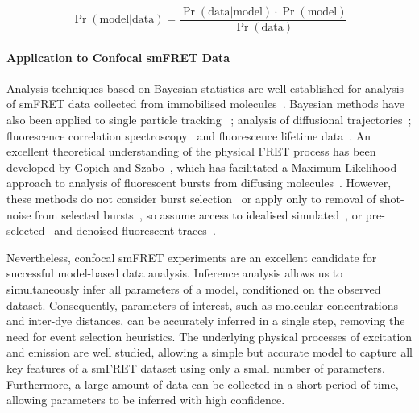 \begin{equation}
\Pr(\text{model}|\text{data}) = \frac{\Pr(\text{data}|\text{model}) \cdot \Pr(\text{model})}{\Pr(\text{data})} 
\label{eq:model_probability}
\end{equation}

\paragraph{Application to Confocal smFRET Data}
Analysis techniques based on Bayesian statistics are well established for analysis of smFRET data collected from immobilised molecules~\cite{mckinney06, bronson09, bronson10, taylor10, taylor11, uphoff2011}. Bayesian methods have also been applied to single particle tracking ~\cite{yoon08}; analysis of diffusional trajectories~\cite{turkcan12, stigler2012}; fluorescence correlation spectroscopy~\cite{kugel12, guo11, he11, guo2014} and fluorescence lifetime data~\cite{kou05, kalinin2008}. An excellent theoretical understanding of the physical FRET process has been developed by Gopich and Szabo~\cite{gopich07, gopich09, gopich12}, which has facilitated a Maximum Likelihood approach to analysis of fluorescent bursts from diffusing molecules~\cite{gopich12, devore12}.  However, these methods do not consider burst selection~\cite{gopich12} or apply only to removal of shot-noise from selected bursts~\cite{gopich07}, so assume access to idealised simulated~\cite{gopich07}, or pre-selected~\cite{devore12, gopich12} and denoised fluorescent traces~\cite{kou05}.

Nevertheless, confocal smFRET experiments are an excellent candidate for successful model-based data analysis. Inference analysis allows us to simultaneously infer all parameters of a model, conditioned on the observed dataset. Consequently, parameters of interest, such as molecular concentrations and inter-dye distances, can be accurately inferred in a single step, removing the need for event selection heuristics. The underlying physical processes of excitation and emission are well studied, allowing a simple but accurate model to capture all key features of a smFRET dataset using only a small number of parameters. Furthermore, a large amount of data can be collected in a short period of time, allowing parameters to be inferred with high confidence.


